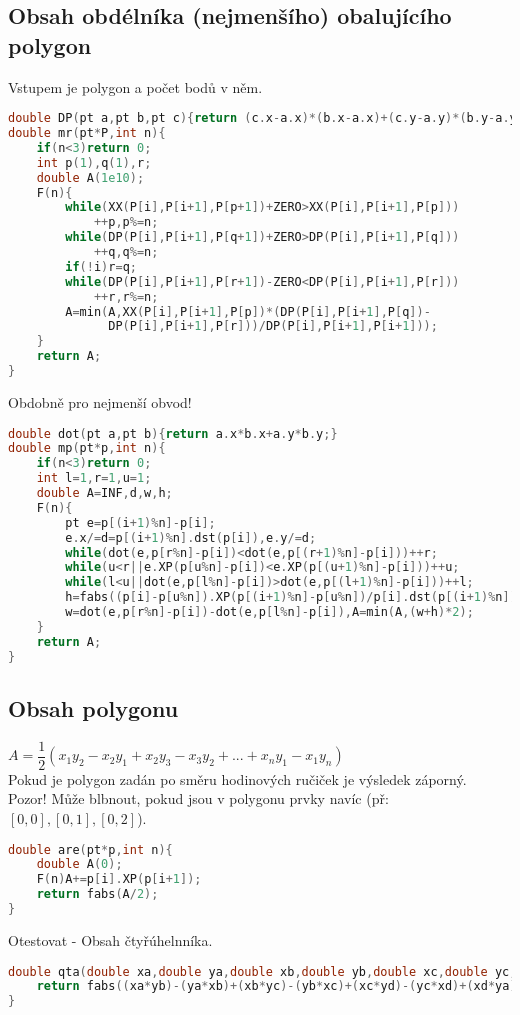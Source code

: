 \documentclass[11pt]{article}
\begin{document}
\subsection{Obsah obdélníka (nejmenšího) obalujícího polygon}
Vstupem je polygon a počet bodů v něm.
\begin{lstlisting}[language=C++]
double DP(pt a,pt b,pt c){return (c.x-a.x)*(b.x-a.x)+(c.y-a.y)*(b.y-a.y);}
double mr(pt*P,int n){
    if(n<3)return 0;
    int p(1),q(1),r;
    double A(1e10);
    F(n){
        while(XX(P[i],P[i+1],P[p+1])+ZERO>XX(P[i],P[i+1],P[p]))
            ++p,p%=n;
        while(DP(P[i],P[i+1],P[q+1])+ZERO>DP(P[i],P[i+1],P[q]))
            ++q,q%=n;
        if(!i)r=q;
        while(DP(P[i],P[i+1],P[r+1])-ZERO<DP(P[i],P[i+1],P[r]))
            ++r,r%=n;
        A=min(A,XX(P[i],P[i+1],P[p])*(DP(P[i],P[i+1],P[q])-
              DP(P[i],P[i+1],P[r]))/DP(P[i],P[i+1],P[i+1]));
    }
    return A;
}
\end{lstlisting}
Obdobně pro nejmenší obvod!
\begin{lstlisting}[language=C++]
double dot(pt a,pt b){return a.x*b.x+a.y*b.y;}
double mp(pt*p,int n){
	if(n<3)return 0;
	int l=1,r=1,u=1;
    double A=INF,d,w,h;
    F(n){
		pt e=p[(i+1)%n]-p[i];
        e.x/=d=p[(i+1)%n].dst(p[i]),e.y/=d;
		while(dot(e,p[r%n]-p[i])<dot(e,p[(r+1)%n]-p[i]))++r;
		while(u<r||e.XP(p[u%n]-p[i])<e.XP(p[(u+1)%n]-p[i]))++u;
		while(l<u||dot(e,p[l%n]-p[i])>dot(e,p[(l+1)%n]-p[i]))++l;
		h=fabs((p[i]-p[u%n]).XP(p[(i+1)%n]-p[u%n])/p[i].dst(p[(i+1)%n]));
        w=dot(e,p[r%n]-p[i])-dot(e,p[l%n]-p[i]),A=min(A,(w+h)*2);
	}
    return A;
}
\end{lstlisting}
\subsection{Obsah polygonu}
$A=\dfrac{1}{2}(x_1y_2-x_2y_1+x_2y_3-x_3y_2+...+x_ny_1-x_1y_n)$
\vspace{2mm}
\\Pokud je polygon zadán po směru hodinových ručiček je výsledek záporný.
\\Pozor! Může blbnout, pokud jsou v polygonu prvky navíc (př: $[0,0],[0,1],[0,2]$).
\begin{lstlisting}[language=C++]
double are(pt*p,int n){
    double A(0);
    F(n)A+=p[i].XP(p[i+1]);
    return fabs(A/2);
}
\end{lstlisting}
Otestovat - Obsah čtyřúhelnníka.
\begin{lstlisting}[language=C++]
double qta(double xa,double ya,double xb,double yb,double xc,double yc,double xd,double yd){
    return fabs((xa*yb)-(ya*xb)+(xb*yc)-(yb*xc)+(xc*yd)-(yc*xd)+(xd*ya)-(yd*xa))/2;
}
\end{lstlisting}
\end{document}
